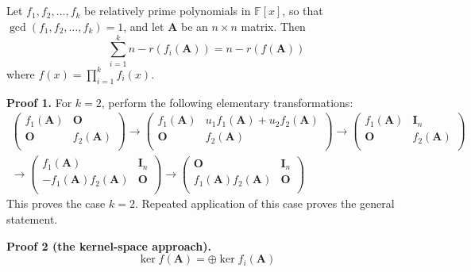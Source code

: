 \documentclass[12pt, a4paper, oneside]{book}
\begin{document}
\subsection{}
\begin{theorem}
    Let $f_1,f_2,\ldots,f_k$ be relatively prime polynomials in $\mathbb{F}[x]$, so that $\gcd(f_1,f_2,\ldots,f_k)=1$, and let $\mathbf{A}$ be an $n \times n$ matrix. Then
    \[
        \sum_{i=1}^k n-r\left(f_i(\mathbf{A})\right)
        =
        n -r(f(\mathbf{A}))
    \]
    where $f(x) = \prod\limits_{i=1}^k f_i(x)$.

    \textbf{Proof 1.}
    For $k=2$, perform the following elementary transformations:
    \[
        \begin{aligned}
            \left(\begin{matrix}
                      f_1(\mathbf{A}) & \mathbf{O}      \\
                      \mathbf{O}      & f_2(\mathbf{A}) \\
                  \end{matrix}\right)
            \rightarrow
            \left(\begin{matrix}
                      f_1(\mathbf{A}) & u_1f_1(\mathbf{A})+u_2f_2(\mathbf{A}) \\
                      \mathbf{O}      & f_2(\mathbf{A})                       \\
                  \end{matrix}\right)
            \rightarrow
            \left(\begin{matrix}
                      f_1(\mathbf{A}) & \mathbf{I}_n    \\
                      \mathbf{O}      & f_2(\mathbf{A}) \\
                  \end{matrix}\right) \\
            \rightarrow
            \left(\begin{matrix}
                      f_1(\mathbf{A})                 & \mathbf{I}_n \\
                      -f_1(\mathbf{A})f_2(\mathbf{A}) & \mathbf{O}   \\
                  \end{matrix}\right)
            \rightarrow
            \left(\begin{matrix}
                      \mathbf{O}                     & \mathbf{I}_n \\
                      f_1(\mathbf{A})f_2(\mathbf{A}) & \mathbf{O}   \\
                  \end{matrix}\right)
        \end{aligned}
    \]
    This proves the case $k=2$. Repeated application of this case proves the general statement.

    \textbf{Proof 2 (the kernel-space approach).}
    \[
        \ker f(\mathbf{A}) = \oplus \ker f_i(\mathbf{A})\]
\end{theorem}
\end{document}
